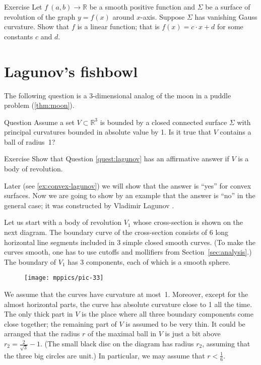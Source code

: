\begin{thm}{Exercise}\label{ex:rev(lin)}
Let $f\:(a,b)\to\mathbb{R}$ be a smooth positive function and $\Sigma$ be a surface of revolution of the graph $y=f(x)$ around $x$-axis.
Suppose $\Sigma$ has vanishing Gauss curvature.
Show that $f$ is a linear function; that is $f(x)=c\cdot x+d$ for some constants $c$ and $d$.
\end{thm}

\section{Lagunov's fishbowl}

The following question is a 3-dimensional analog of the moon in a puddle problem (\ref{thm:moon}).

\begin{thm}{Question}\label{quest:lagunov}
Assume a set $V\subset \mathbb{R}^3$ is bounded by a closed connected surface $\Sigma$ with 
principal curvatures bounded in absolute value by 1.
Is it true that $V$ contains a ball of radius~1?
\end{thm}

\begin{thm}{Exercise}\label{ex:moon-revolution}
Show that Question \ref{quest:lagunov} has an affirmative answer if $V$ is a body of revolution.
\end{thm}

Later (see \ref{ex:convex-lagunov})
we will show that the answer is ``yes'' for convex surfaces.
Now we are going to show by an example that the answer is ``no'' in the general case;
it was constructed by Vladimir Lagunov \cite{lagunov-1961}.

Let us start with a body of revolution $V_1$ whose cross-section is shown on the next diagram.
The boundary curve of the cross-section consists of 6 long horizontal line segments included in 3 simple closed smooth curves.
(To make the curves smooth, one has to use cutoffs and mollifiers from Section~\ref{sec:analysis}.)
The boundary of $V_1$ has 3 components, each of which is a smooth sphere.

\begin{figure}[ht!]
\centering
\texttt{[image: mppics/pic-33]}
\vskip0mm
\end{figure}

We assume that the curves have curvature at most~1.
Moreover, except for the almost horizontal parts, the curve has absolute curvature close to 1 all the time.
The only thick part in $V$ is the place where all three boundary components come close together;
the remaining part of $V$ is assumed to be very thin.
It could be arranged that the radius $r$ of the maximal ball in $V$ is just a bit above 
$r_2=\tfrac2{\sqrt{3}}-1$.
(The small black disc on the diagram has radius $r_2$,
assuming that the three big circles are unit.)
In particular, we may assume that $r<\tfrac16$.

